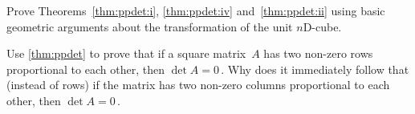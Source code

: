 \begin{exercise} \label{ex:} 
Prove Theorems~\ref{thm:ppdet:i}, \ref{thm:ppdet:iv} and~\ref{thm:ppdet:ii} using basic geometric arguments about the transformation of the unit \(n\)D-cube.
%
\end{exercise}




\begin{exercise} \label{ex:} 
Use \autoref{thm:ppdet} to prove that if a square matrix~\(A\) has two non-zero rows proportional to each other, then \(\det A=0\)\,.
Why does it immediately follow that (instead of rows) if the matrix has two non-zero columns proportional to each other, then \(\det A=0\)\,.
\end{exercise}




